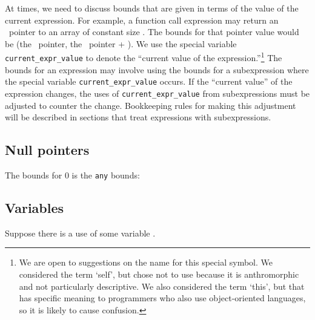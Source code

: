 At times, we need to discuss bounds that are given in terms of the value
of the current expression. For example, a function call expression may
return an \arrayptr\ pointer to an array of constant size
. The bounds for that pointer value would be (the
\arrayptr\ pointer, the \arrayptr\ pointer +
). We use the special variable \texttt{current\_expr\_value} to
denote the ``current value of the expression.''\footnote{We are open to
  suggestions on the name for this special symbol. We considered the
  term `self', but chose not to use because it is anthromorphic and not
  particularly descriptive. We also considered the term `this', but that
  has specific meaning to programmers who also use object-oriented
  languages, so it is likely to cause confusion.} The bounds for an
expression may involve using the bounds for a subexpression where the
special variable \texttt{current\_expr\_value} occurs. If the ``current
value'' of the expression changes, the uses of
\texttt{current\_expr\_value} from subexpressions must be adjusted to
counter the change. Bookkeeping rules for making this adjustment will be
described in sections that treat expressions with subexpressions.

\subsection{Null pointers}

The bounds for 0 is the \texttt{any} bounds:


\subsection{Variables}
\label{section:checking-variables}

Suppose there is a use of some variable .


